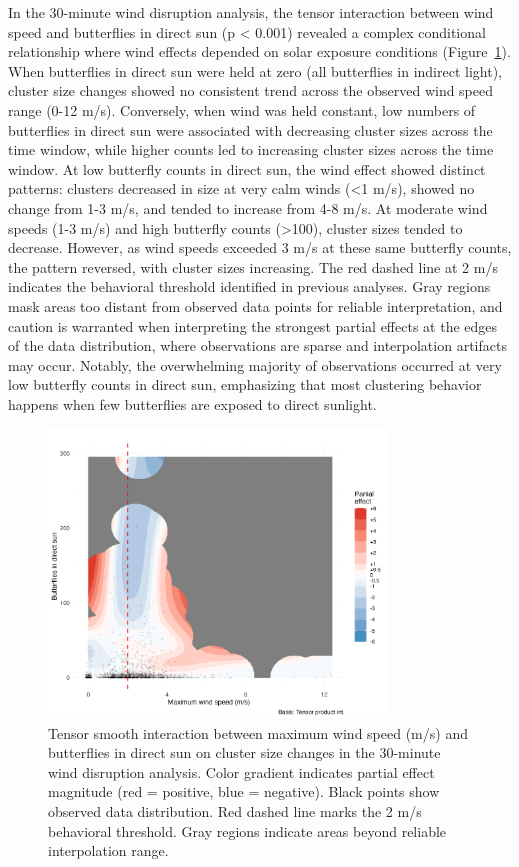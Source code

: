 In the 30-minute wind disruption analysis, the tensor interaction between wind speed and butterflies in direct sun (p < 0.001) revealed a complex conditional relationship where wind effects depended on solar exposure conditions (Figure~\ref{fig:interaction_wind_sun}). When butterflies in direct sun were held at zero (all butterflies in indirect light), cluster size changes showed no consistent trend across the observed wind speed range (0-12 m/s). Conversely, when wind was held constant, low numbers of butterflies in direct sun were associated with decreasing cluster sizes across the time window, while higher counts led to increasing cluster sizes across the time window. At low butterfly counts in direct sun, the wind effect showed distinct patterns: clusters decreased in size at very calm winds (<1 m/s), showed no change from 1-3 m/s, and tended to increase from 4-8 m/s. At moderate wind speeds (1-3 m/s) and high butterfly counts (>100), cluster sizes tended to decrease. However, as wind speeds exceeded 3 m/s at these same butterfly counts, the pattern reversed, with cluster sizes increasing. The red dashed line at 2 m/s indicates the behavioral threshold identified in previous analyses. Gray regions mask areas too distant from observed data points for reliable interpretation, and caution is warranted when interpreting the strongest partial effects at the edges of the data distribution, where observations are sparse and interpolation artifacts may occur. Notably, the overwhelming majority of observations occurred at very low butterfly counts in direct sun, emphasizing that most clustering behavior happens when few butterflies are exposed to direct sunlight. 

\begin{figure}[htbp]
    \centering
    \includegraphics[width=0.8\textwidth]{supplemental/results/30_min/figures/interaction_wind_x_sun_binned.png}
    \caption{Tensor smooth interaction between maximum wind speed (m/s) and butterflies in direct sun on cluster size changes in the 30-minute wind disruption analysis. Color gradient indicates partial effect magnitude (red = positive, blue = negative). Black points show observed data distribution. Red dashed line marks the 2 m/s behavioral threshold. Gray regions indicate areas beyond reliable interpolation range.}
    \label{fig:interaction_wind_sun}
\end{figure}

